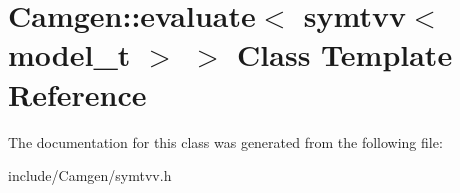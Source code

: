 \hypertarget{a00201}{}\section{Camgen\+:\+:evaluate$<$ symtvv$<$ model\+\_\+t $>$ $>$ Class Template Reference}
\label{a00201}


The documentation for this class was generated from the following file\+:\begin{DoxyCompactItemize}
\item 
include/\+Camgen/symtvv.\+h\end{DoxyCompactItemize}
